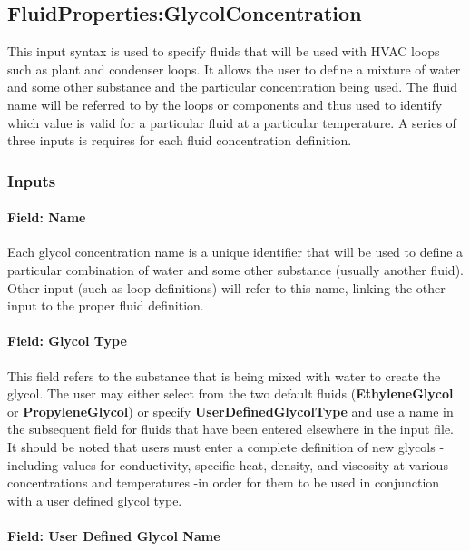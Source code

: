 \subsection{FluidProperties:GlycolConcentration}\label{fluidpropertiesglycolconcentration}

This input syntax is used to specify fluids that will be used with HVAC loops such as plant and condenser loops. It allows the user to define a mixture of water and some other substance and the particular concentration being used. The fluid name will be referred to by the loops or components and thus used to identify which value is valid for a particular fluid at a particular temperature. A series of three inputs is requires for each fluid concentration definition.

\subsubsection{Inputs}\label{inputs-1-018}

\paragraph{Field: Name}\label{field-name-019}

Each glycol concentration name is a unique identifier that will be used to define a particular combination of water and some other substance (usually another fluid). Other input (such as loop definitions) will refer to this name, linking the other input to the proper fluid definition.

\paragraph{Field: Glycol Type}\label{field-glycol-type}

This field refers to the substance that is being mixed with water to create the glycol. The user may either select from the two default fluids (\textbf{EthyleneGlycol} or \textbf{PropyleneGlycol}) or specify \textbf{UserDefinedGlycolType} and use a name in the subsequent field for fluids that have been entered elsewhere in the input file. It should be noted that users must enter a complete definition of new glycols -including values for conductivity, specific heat, density, and viscosity at various concentrations and temperatures -in order for them to be used in conjunction with a user defined glycol type.

\paragraph{Field: User Defined Glycol Name}\label{field-user-defined-glycol-name}

